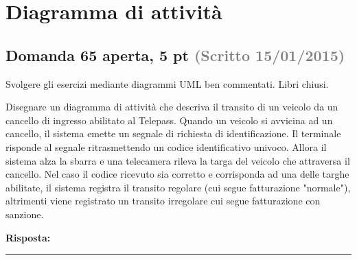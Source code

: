 \documentclass[a4paper,11pt]{article}
\begin{document}
\section{Diagramma di attività}

\subsection*{Domanda 65 \hfill {\small aperta, 5 pt \textcolor{gray}{(Scritto 15/01/2015)}}}
\begin{tcolorbox}[colback=gray!8,colframe=gray!50,title=Contesto]
Svolgere gli esercizi mediante diagrammi UML ben commentati. Libri chiusi.
\end{tcolorbox}
Disegnare un diagramma di attività che descriva il transito di un veicolo da un cancello di ingresso abilitato al Telepass. Quando un veicolo si avvicina ad un cancello, il sistema emette un segnale di richiesta di identificazione. Il terminale risponde al segnale ritrasmettendo un codice identificativo univoco. Allora il sistema alza la sbarra e una telecamera rileva la targa del veicolo che attraversa il cancello. Nel caso il codice ricevuto sia corretto e corrisponda ad una delle targhe abilitate, il sistema registra il transito regolare (cui segue fatturazione "normale"), altrimenti viene registrato un transito irregolare cui segue fatturazione con sanzione.

\vspace{0.2cm}
\noindent\textbf{Risposta:}\par
\vspace{4cm}\hrule


\end{document}

